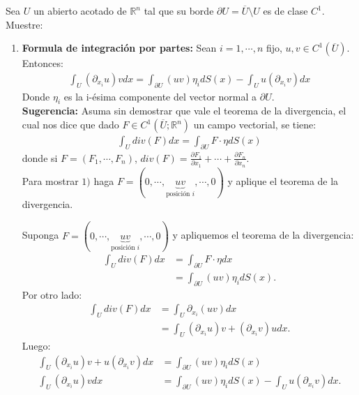 \begin{homeworkProblem}
  Sea $U$ un abierto acotado de $\mathbb{R}^{n}$ tal que su borde $\partial U=\overline{U}\setminus U$ es de clase $C^1$. Muestre:
  \begin{enumerate}
    \item \textbf{Formula de integración por partes:} Sean $i=1,\cdots,n$ fijo, $u,v\in C^{1}(\overline{U})$. Entonces:
      \begin{align*}
        \int_{U}(\partial_{x_i}u)vdx=\int_{\partial U}(uv)\eta_{i}dS(x)-\int_{U}u(\partial_{x_i}v)dx
      \end{align*}
      Donde $\eta_i$ es la i-ésima componente del vector normal a $\partial U$.\\
      \textbf{Sugerencia:} Asuma sin demostrar que vale el teorema de la divergencia, el cual nos dice que dado $F\in C^1(\overline{U};\mathbb{R}^{n})$ un campo vectorial, se tiene:
      \begin{align*}
        \int_{U}div(F)dx=\int_{\partial U} F\cdot \eta dS(x)
      \end{align*}
      donde si $F=(F_1,\cdots,F_n)$, $div(F)=\frac{\partial F_1}{\partial x_1}+\cdots+\frac{\partial F_n}{\partial x_n}$.\\
      Para mostrar $1)$ haga $F=(0,\cdots,\underset{\text{posición $i$}}{\underbrace{uv}},\cdots,0)$ y aplique el teorema de la divergencia.
      \begin{solucion}
        Suponga $F=(0,\cdots,\underset{\text{posición $i$}}{\underbrace{uv}},\cdots,0)$ y apliquemos el teorema de la divergencia:
        \begin{align*}
          \int_{U}div(F)dx&=\int_{\partial U}F\cdot \eta dx\\
          &=\int_{\partial U}(uv)\eta_i dS(x).
        \end{align*}
        Por otro lado:
        \begin{align*}
          \int_{U}div(F)dx&=\int_{U} \partial_{x_i}(uv)dx\\
          &=\int_{U}(\partial_{x_i}u)v+(\partial_{x_i}v)udx.
        \end{align*}
        Luego:
        \begin{align*}
          \int_{U}(\partial_{x_i}u)v+u(\partial_{x_i}v)dx&=\int_{\partial U}(uv)\eta_i dS(x)\\
          \int_{U}(\partial_{x_i}u)vdx&=\int_{\partial U}(uv)\eta_i dS(x)-\int_{U}u(\partial_{x_i}v)dx.
        \end{align*}
        \demostrado
      \end{solucion}

\end{enumerate}
\end{homeworkProblem}
